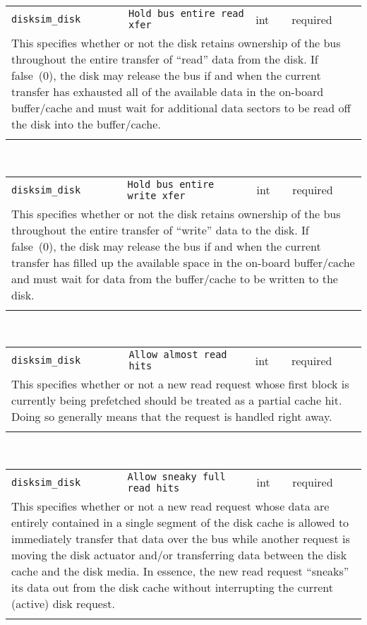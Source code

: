 \noindent 
\begin{tabular}{|p{1.5in}|p{3.5in}|p{0.5in}|p{0.5in}|}
\cline{1-4}
\texttt{disksim\_disk} & \texttt{Hold bus entire read xfer} & int & required \\ 
\cline{1-4}
\multicolumn{4}{|p{6in}|}{
This specifies whether or not the disk retains ownership of the bus
throughout the entire transfer of ``read'' data from the disk. If
false~(0), the disk may release the bus if and when the current
transfer has exhausted all of the available data in the on-board
buffer/cache and must wait for additional data sectors to be read off
the disk into the buffer/cache.
}\\ 
\cline{1-4}
\multicolumn{4}{p{5in}}{}\\
\end{tabular}\\ 
\noindent 
\begin{tabular}{|p{1.5in}|p{3.5in}|p{0.5in}|p{0.5in}|}
\cline{1-4}
\texttt{disksim\_disk} & \texttt{Hold bus entire write xfer} & int & required \\ 
\cline{1-4}
\multicolumn{4}{|p{6in}|}{
This specifies whether or not the disk retains ownership of the bus
throughout the entire transfer of ``write'' data to the disk. If
false~(0), the disk may release the bus if and when the current
transfer has filled up the available space in the on-board
buffer/cache and must wait for data from the buffer/cache to be
written to the disk.
}\\ 
\cline{1-4}
\multicolumn{4}{p{5in}}{}\\
\end{tabular}\\ 
\noindent 
\begin{tabular}{|p{1.5in}|p{3.5in}|p{0.5in}|p{0.5in}|}
\cline{1-4}
\texttt{disksim\_disk} & \texttt{Allow almost read hits} & int & required \\ 
\cline{1-4}
\multicolumn{4}{|p{6in}|}{
This specifies whether or not a new read request whose first block is
currently being prefetched should be treated as a partial cache hit.
Doing so generally means that the request is handled right away.
}\\ 
\cline{1-4}
\multicolumn{4}{p{5in}}{}\\
\end{tabular}\\ 
\noindent 
\begin{tabular}{|p{1.5in}|p{3.5in}|p{0.5in}|p{0.5in}|}
\cline{1-4}
\texttt{disksim\_disk} & \texttt{Allow sneaky full read hits} & int & required \\ 
\cline{1-4}
\multicolumn{4}{|p{6in}|}{
This specifies whether or not a new read request whose data are entirely
contained in a single segment of the disk cache is allowed to
immediately transfer that data over the bus while another request is
moving the disk actuator and/or transferring data between the disk
cache and the disk media. In essence, the new read request ``sneaks''
its data out from the disk cache without interrupting the current
(active) disk request.
}\\ 
\cline{1-4}
\multicolumn{4}{p{5in}}{}\\
\end{tabular}\\ 
